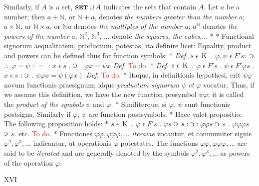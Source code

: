 \documentclass{book}
\newcommand{\s}{\switchcolumn} %
\newcommand{\C}{\mathop{\sbox0{$\displaystyle$$\reflectbox{C}$} %
\raisebox{-\height+\ht0-0.05cm}[\ht0][\dp0]{\scalebox{0.8}[0.8]{\copy0}}}\displaylimits} %
\newcommand{\pppNoSpace}{\leavevmode\lower0ex\hbox{.}\kern-0.1em\raise0.7ex\hbox{.}\kern-0.1em\lower0ex\hbox{.}} %
\newcommand{\smallIn}{\ensuremath{\mathrel{\epsilon}}}
\newcommand{\K}{\mathop{\thinspace \text{K} \thinspace}}
\newcommand{\setOfSets}{\mathord{\text{{\footnotesize \textbf{SET}}}}}
\newcommand\todo{\textcolor{brown}{To do.}}
\newcommand{\peanoPage}[1]{\vspace{1ex}

  \columnratio{0.475, 0.05, 0.475} \begin{paracol}{3} \centering \hdashrule{\columnwidth}{0.1mm}{0.1mm 1mm} \s #1 \s \hdashrule{\columnwidth}{0.1mm}{0.1mm 1mm} \end{paracol}

\vspace{1ex}}
\newenvironment{translateTwoCol}
               { %
                 \columnratio{0.5, 0.5} \begin{paracol}{2}
                 \newcommand{\LAT}{\switchcolumn[0]*}
                 \newcommand{\ENG}{\switchcolumn[1]}
               }
               { %
                 \let\ENG\undefined
                 \let\LAT\undefined
                 \end{paracol}
               }
\begin{document}
\begin{translateTwoCol}
\ENG
Similarly, if $A$ is a set, $\setOfSets \cup A$ indicates the sets that contain $A$. Let $a$ be a number; then $a + \mathbb{N}$, or $\mathbb{N} + a$, denotes \emph{the numbers greater than the number} $a$; $a \times \mathbb{N}$, or $\mathbb{N} \times a$, or $\mathbb{N} a$ denotes \emph{the multiples of the number} $a$; $a^\mathbb{N}$ denotes \emph{the powers of the number} $a$; $\mathbb{N}^2$, $\mathbb{N}^3$, ... denote \emph{the squares}, \emph{the cubes},...
\LAT
\hfill
\ENG
\hfill
\LAT
Functional signorum aequalitatem, productum, potestas, ita definire licet:
\ENG
Equality, product and powers can be defined thus for function symbols:
\LAT
\emph{Def.} \hspace{0.25cm} $s \smallIn \K$ . $\varphi, \psi \smallIn F' s :$ $\C$ $\pppNoSpace$ $\varphi = \psi$ : $=$ : $x \smallIn s$ . $\C$ . $\varphi x = \psi x$
\ENG
\emph{Def.} \hspace{0.25cm} \todo
\LAT
\emph{Def.} \hspace{0.25cm} $s \smallIn \K$ . $\varphi \smallIn F' s$ $.$ $\psi \smallIn F' \varphi s$ . $x \smallIn s$ : $\C$ . $\psi \varphi x = \psi (\varphi x)$
\ENG
\emph{Def.} \hspace{0.25cm} \todo
\LAT
Itaque, in definitionis hypothesi, erit $\psi \varphi$ novum functionis praesignum; idque \emph{productum signorum} $\psi$ \emph{et} $\varphi$ vocatur.
\ENG
Thus, if we assume this definition, we have the new function presymbol $\psi \varphi$; it is called the \emph{product of the symbols} $\psi$ and $\varphi$.
\LAT
Similiterque, si $\varphi$, $\psi$ sunt functionis postsigna.
\ENG
Similarly if $\varphi$, $\psi$ are function postsymbols.
\LAT
Haec valet propositio:
\ENG
The following proposition holds:
\LAT
\hspace{1.06cm} $s \smallIn \K$ . $\varphi \smallIn F' s$ . $\varphi s$ $\C$ $s : \C : \varphi \varphi s$ $\C$ $s$ . $\varphi \varphi \varphi s$ $\C$ $s$. etc.
\ENG
\todo
\LAT
Funcitones $\varphi \varphi, \varphi \varphi \varphi,...$ \emph{iteraiae} vocantur, et communiter signis $\varphi^2, \varphi^3,...$ indicantur, ut operationis $\varphi$ potestates.
\ENG
The functions $\varphi \varphi, \varphi \varphi \varphi,...$ are said to be \emph{iterated} and are generally denoted by the symbols $\varphi^2, \varphi^3,...$ as powers of the operation $\varphi$.
\end{translateTwoCol}

\peanoPage{XVI} %
\end{document}
